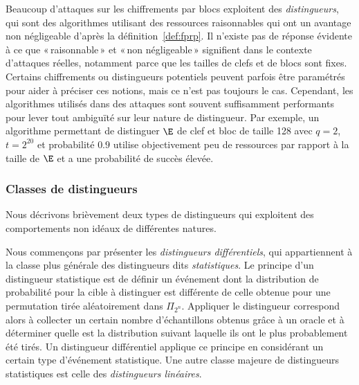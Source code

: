 Beaucoup d'attaques sur les chiffrements par blocs exploitent des \emph{distingueurs}, qui sont des algorithmes utilisant des ressources
raisonnables qui ont un avantage non négligeable d'après la définition~\ref{def:fprp}.
Il n'existe pas de réponse évidente à ce que «\,raisonnable\,» et «\,non négligeable\,» signifient dans le contexte d'attaques réelles,
notamment parce que les tailles de clefs
et de blocs sont fixes. Certains chiffrements ou distingueurs potentiels peuvent
parfois être paramétrés pour aider à préciser ces notions, mais ce n'est pas toujours le cas.
Cependant, les algorithmes utilisés dans des attaques sont souvent suffisamment performants pour lever tout ambiguïté sur leur nature de distingueur.
Par exemple,
un algorithme permettant de distinguer $\E$ de clef et bloc de taille 128 avec $q = 2$, $t = 2^{20}$ et probabilité $0.9$
utilise objectivement peu de ressources par rapport à la taille de $\E$ et a une probabilité de succès élevée.

\subsubsection{Classes de distingueurs}

Nous décrivons brièvement deux types de distingueurs qui exploitent des comportements non idéaux de différentes natures.

\bigskip

Nous commençons par présenter les \emph{distingueurs différentiels}, qui appartiennent à la classe plus générale des distingueurs
dits \emph{statistiques}.
Le principe d'un distingueur statistique 
est de définir un événement dont la distribution de probabilité pour la cible à distinguer
est différente de celle obtenue pour une permutation tirée aléatoirement dans $\Pi_{2^n}$.
Appliquer le distingueur correspond alors à collecter un certain nombre d'échantillons obtenus grâce à un oracle
et à déterminer quelle est la distribution suivant laquelle ils ont le plus probablement été tirés.
Un distingueur différentiel applique ce principe en considérant un certain type d'événement statistique. Une autre classe
majeure de distingueurs statistiques est celle des \emph{distingueurs linéaires}.


